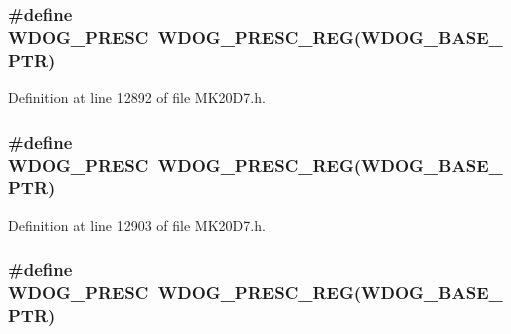 \subsubsection[{\texorpdfstring{W\+D\+O\+G\+\_\+\+P\+R\+E\+SC}{WDOG_PRESC}}]{\setlength{\rightskip}{0pt plus 5cm}\#define W\+D\+O\+G\+\_\+\+P\+R\+E\+SC~{\bf W\+D\+O\+G\+\_\+\+P\+R\+E\+S\+C\+\_\+\+R\+EG}({\bf W\+D\+O\+G\+\_\+\+B\+A\+S\+E\+\_\+\+P\+TR})}\hypertarget{group___w_d_o_g___register___accessor___macros_gac927e6dd73774cbbb57d36bbe3351925}{}\label{group___w_d_o_g___register___accessor___macros_gac927e6dd73774cbbb57d36bbe3351925}


Definition at line 12892 of file M\+K20\+D7.\+h.

\subsubsection[{\texorpdfstring{W\+D\+O\+G\+\_\+\+P\+R\+E\+SC}{WDOG_PRESC}}]{\setlength{\rightskip}{0pt plus 5cm}\#define W\+D\+O\+G\+\_\+\+P\+R\+E\+SC~{\bf W\+D\+O\+G\+\_\+\+P\+R\+E\+S\+C\+\_\+\+R\+EG}({\bf W\+D\+O\+G\+\_\+\+B\+A\+S\+E\+\_\+\+P\+TR})}\hypertarget{group___w_d_o_g___register___accessor___macros_gac927e6dd73774cbbb57d36bbe3351925}{}\label{group___w_d_o_g___register___accessor___macros_gac927e6dd73774cbbb57d36bbe3351925}


Definition at line 12903 of file M\+K20\+D7.\+h.

\subsubsection[{\texorpdfstring{W\+D\+O\+G\+\_\+\+P\+R\+E\+SC}{WDOG_PRESC}}]{\setlength{\rightskip}{0pt plus 5cm}\#define W\+D\+O\+G\+\_\+\+P\+R\+E\+SC~{\bf W\+D\+O\+G\+\_\+\+P\+R\+E\+S\+C\+\_\+\+R\+EG}({\bf W\+D\+O\+G\+\_\+\+B\+A\+S\+E\+\_\+\+P\+TR})}\hypertarget{group___w_d_o_g___register___accessor___macros_gac927e6dd73774cbbb57d36bbe3351925}{}\label{group___w_d_o_g___register___accessor___macros_gac927e6dd73774cbbb57d36bbe3351925}


